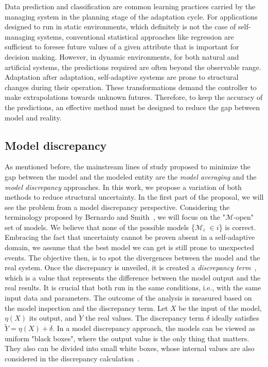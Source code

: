 Data prediction and classification are common learning practices carried by the managing system in the planning stage of the adaptation cycle. For applications designed to run in static environments, which definitely is not the case of self-managing systems, conventional statistical approaches like regression are sufficient to foresee future values of a given attribute that is important for decision making. However, in dynamic environments, for both natural and artificial systems, the predictions required are often beyond the observable range. Adaptation after adaptation, self-adaptive systems are prone to structural changes during their operation. These transformations demand the controller to make extrapolations towards unknown futures. Therefore, to keep the accuracy of the predictions, an effective method must be designed to reduce the gap between model and reality.

\subsection{Model discrepancy}

As mentioned before, the mainstream lines of study proposed to minimize the gap between the model and the modeled entity are the \textit{model averaging} and the \textit{model discrepancy} approaches. In this work, we propose a variation of both methods to reduce structural uncertainty. In the first part of the proposal, we will see the problem from a model discrepancy perspective. Considering the terminology proposed by Bernardo and Smith~\cite{bernardo2009bayesian}, we will focus on the "$\mathcal{M}$-open" set of models. We believe that none of the possible models \{$\mathcal{M}_i$ $\in i$\} is correct. Embracing the fact that uncertainty cannot be proven absent in a self-adaptive domain, we assume that the best model we can get is still prone to unexpected events. The objective then, is to spot the divergences between the model and the real system. Once the discrepancy is unveiled, it is created a \textit{discrepancy term}~\cite{refsgaard2006framework}, which is a value that represents the difference between the model output and the real results. It is crucial that both run in the same conditions, i.e., with the same input data and parameters. The outcome of the analysis is measured based on the model inspection and the  discrepancy term. Let $X$ be the input of the model, $\eta(X)$ its output, and $\tilde{Y}$ the real values. The discrepancy term $\delta$ ideally satisfies $\tilde{Y} = \eta(X) + \delta$. In a model discrepancy approach, the models can be viewed as uniform "black boxes", where the output value is the only thing that matters. They also can be divided into small white boxes, whose internal values are also considered in the discrepancy calculation~\cite{kennedy2001bayesian}.

